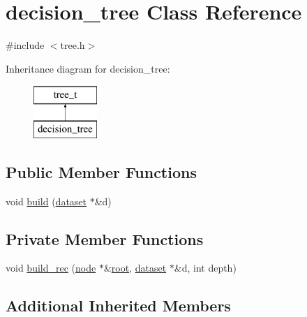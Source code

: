 \hypertarget{classdecision__tree}{\section{decision\+\_\+tree Class Reference}
\label{classdecision__tree}
}


{\ttfamily \#include $<$tree.\+h$>$}

Inheritance diagram for decision\+\_\+tree\+:\begin{figure}[H]
\begin{center}
\leavevmode
\includegraphics[height=2.000000cm]{classdecision__tree}
\end{center}
\end{figure}
\subsection*{Public Member Functions}
\begin{DoxyCompactItemize}
\item 
void \hyperlink{classdecision__tree_ad3286ad0d5361f3f19ddac966477b14a}{build} (\hyperlink{classdataset}{dataset} $\ast$\&d)
\end{DoxyCompactItemize}
\subsection*{Private Member Functions}
\begin{DoxyCompactItemize}
\item 
void \hyperlink{classdecision__tree_affee9d32ce17c6102083d809da55a847}{build\+\_\+rec} (\hyperlink{classnode}{node} $\ast$\&\hyperlink{classtree_ad397d4906e47149b98f769b3e81473ee}{root}, \hyperlink{classdataset}{dataset} $\ast$\&d, int depth)
\end{DoxyCompactItemize}
\subsection*{Additional Inherited Members}


